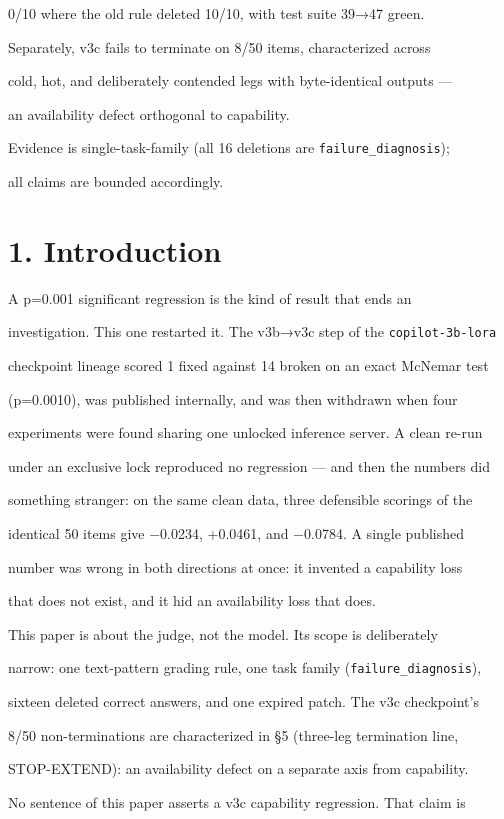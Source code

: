 \documentclass[11pt,a4paper]{article}
\begin{document}
0/10 where the old rule deleted 10/10, with test suite 39→47 green.

Separately, v3c fails to terminate on 8/50 items, characterized across

cold, hot, and deliberately contended legs with byte-identical outputs —

an availability defect orthogonal to capability.

Evidence is single-task-family (all 16 deletions are \texttt{failure\_diagnosis});

all claims are bounded accordingly.

\section*{1. Introduction}
A p=0.001 significant regression is the kind of result that ends an

investigation. This one restarted it. The v3b→v3c step of the \texttt{copilot-3b-lora}

checkpoint lineage scored 1 fixed against 14 broken on an exact McNemar test

(p=0.0010), was published internally, and was then withdrawn when four

experiments were found sharing one unlocked inference server. A clean re-run

under an exclusive lock reproduced no regression — and then the numbers did

something stranger: on the same clean data, three defensible scorings of the

identical 50 items give −0.0234, +0.0461, and −0.0784. A single published

number was wrong in both directions at once: it invented a capability loss

that does not exist, and it hid an availability loss that does.

This paper is about the judge, not the model. Its scope is deliberately

narrow: one text-pattern grading rule, one task family (\texttt{failure\_diagnosis}),

sixteen deleted correct answers, and one expired patch. The v3c checkpoint's

8/50 non-terminations are characterized in §5 (three-leg termination line,

STOP-EXTEND): an availability defect on a separate axis from capability.

No sentence of this paper asserts a v3c capability regression. That claim is
\end{document}
